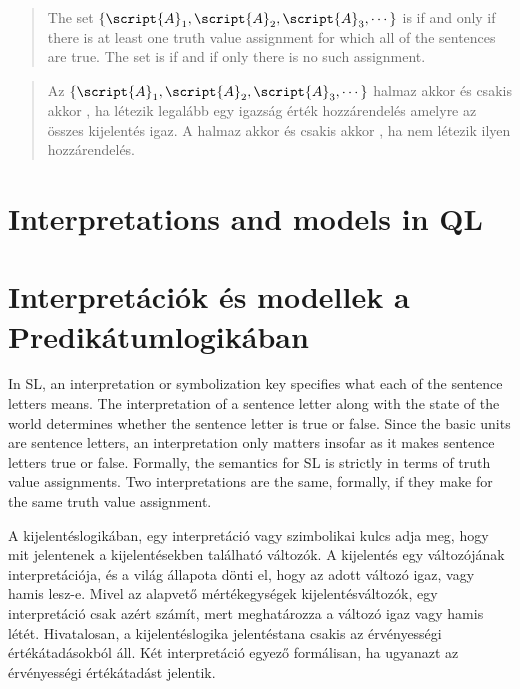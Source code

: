 \begin{quote}
\label{def.consistencySL}
The set $\{\script{A}_1,\script{A}_2,\script{A}_3,\cdots\}$ is  if and only if there is at least one truth value assignment for which all of the sentences are true. The set is  if and if only there is no such assignment.
\end{quote}

\begin{quote}
\label{def.consistencySL}
Az $\{\script{A}_1,\script{A}_2,\script{A}_3,\cdots\}$ halmaz akkor és csakis akkor  , ha létezik legalább egy igazság érték hozzárendelés amelyre az összes kijelentés igaz. A halmaz akkor és csakis akkor  , ha nem létezik ilyen hozzárendelés.
\end{quote}

\section*{Interpretations and models in QL}
\section{Interpretációk és modellek a Predikátumlogikában}

In SL, an interpretation or symbolization key specifies what each of the sentence letters means. The interpretation of a sentence letter along with the state of the world determines whether the sentence letter is true or false.
Since the basic units are sentence letters, an interpretation only matters insofar as it makes sentence letters true or false. Formally, the semantics for SL is strictly in terms of truth value assignments. Two interpretations are the same, formally, if they make for the same truth value assignment.

A kijelentéslogikában, egy interpretáció vagy szimbolikai kulcs adja meg, hogy mit jelentenek a kijelentésekben található változók. A kijelentés egy változójának interpretációja, és a világ állapota dönti el, hogy az adott változó igaz, vagy hamis lesz-e. Mivel az alapvető mértékegységek kijelentésváltozók, egy interpretáció csak azért számít, mert meghatározza a változó igaz vagy hamis létét. Hivatalosan, a kijelentéslogika jelentéstana csakis az érvényességi értékátadásokból áll. Két interpretáció egyező formálisan, ha ugyanazt az érvényességi értékátadást jelentik.

